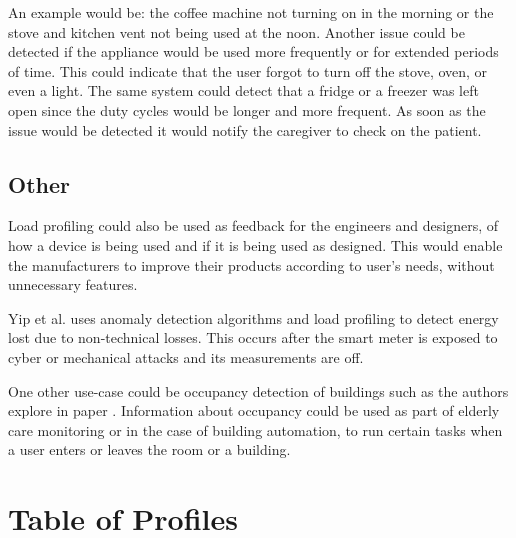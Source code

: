 An example would be: the coffee machine not turning on in the morning or the stove and kitchen vent not being used at the noon.
Another issue could be detected if the appliance would be used more frequently or for extended periods of time. 
This could indicate that the user forgot to turn off the stove, oven, or even a light. The same system could detect 
that a fridge or a freezer was left open since the duty cycles would be longer and more frequent. 
As soon as the issue would be detected it would notify the caregiver to check on the patient.

\subsection{Other}

Load profiling could also be used as feedback for the engineers and designers,
of how a device is being used and if it is being used as designed. 
This would enable the manufacturers to improve their products according to 
user's needs, without unnecessary features.

Yip et al.\cite{energyStealing2018} uses anomaly detection algorithms and load profiling to detect energy lost due to non-technical losses.
This occurs after the smart meter is exposed to cyber or mechanical attacks and its measurements are off. 

One other use-case could be occupancy detection of buildings such as the authors explore in paper \cite{occupancy2013}. Information about 
occupancy could be used as part of elderly care monitoring or in the case of building
automation, to run certain tasks when a user enters or leaves the room or a building.

\section{Table of Profiles}
\label{sec:table_of_profiles}


